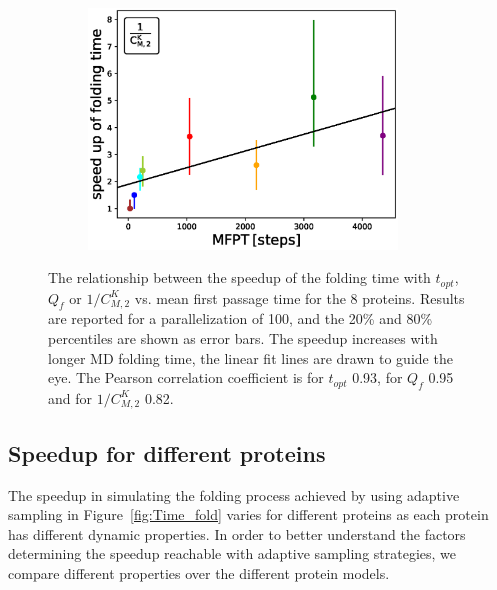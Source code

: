 \begin{figure}[H]
\begin{subfigure}[t]{0.5\textwidth}
    \includegraphics[width=0.9\textwidth]{figures/compare_MD_speed_up_cmacro_kin_cont_50_6_steps10000_52.eps}
  \end{subfigure}
  \caption{The relationship between the speedup of the folding time with $t_{opt}$, $Q_f$
  or $1/C_{M,2}^K$ vs. mean first passage time for the 8 proteins. Results are reported for a
  parallelization of 100, and the 20\% and 80\% percentiles are shown as error
  bars. The speedup increases with longer MD folding time, the linear fit lines are drawn to guide the eye. The Pearson
  correlation coefficient is for $t_{opt}$ 0.93, for $Q_f$ 0.95 and for
  $1/C_{M,2}^K$ 0.82.}
  \label{fig:compare-MD-speed-cmacro}
\end{figure}


\subsection{\label{sec:compare}Speedup for different proteins}

The speedup in simulating the folding process achieved by using adaptive
sampling in Figure~\ref{fig:Time_fold} varies for different proteins as each
protein has different dynamic properties. In order to better understand the
factors determining the speedup reachable with adaptive sampling strategies, we
compare different properties over the different protein models.

